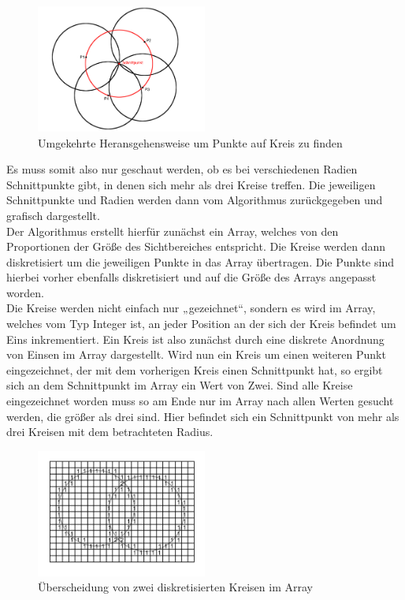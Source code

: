 \documentclass[a4paper,twocolumn]{scrartcl}
\begin{document}
\begin{figure}[h]
\centering
\includegraphics[width=0.5\textwidth]{Bilder/kreise}
\caption{Umgekehrte Heransgehensweise um Punkte auf Kreis zu finden}
\label{img:kreise}
\end{figure}

Es muss somit also nur geschaut werden, ob es bei verschiedenen Radien Schnittpunkte gibt, in denen sich mehr als drei Kreise treffen. Die jeweiligen Schnittpunkte und Radien werden dann vom Algorithmus zurückgegeben und grafisch dargestellt.\\
Der Algorithmus erstellt hierfür zunächst ein Array, welches von den Proportionen der Größe des Sichtbereiches entspricht. Die Kreise werden dann diskretisiert um die jeweiligen Punkte in das Array übertragen. Die Punkte sind hierbei vorher ebenfalls diskretisiert und auf die Größe des Arrays angepasst worden.\\
Die Kreise werden nicht einfach nur „gezeichnet“, sondern es wird im Array, welches vom Typ Integer ist, an jeder Position an der sich der Kreis befindet um Eins inkrementiert. Ein Kreis ist also zunächst durch eine diskrete Anordnung von Einsen im Array dargestellt. Wird nun ein Kreis um einen weiteren Punkt eingezeichnet, der mit dem vorherigen Kreis einen Schnittpunkt hat, so ergibt sich an dem Schnittpunkt im Array ein Wert von Zwei. Sind alle Kreise eingezeichnet worden muss so am Ende nur im Array nach allen Werten gesucht werden, die größer als drei sind. Hier befindet sich ein Schnittpunkt von mehr als drei Kreisen mit dem betrachteten Radius.

\begin{figure}[h]
\centering
\includegraphics[width=0.5\textwidth]{Bilder/diskret}
\caption{Überscheidung von zwei diskretisierten Kreisen im Array}
\label{img:diskret}
\end{figure}
\end{document}
